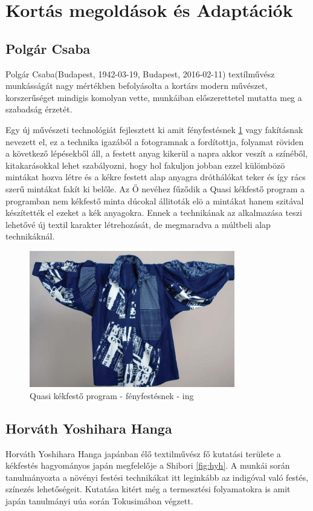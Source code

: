 \documentclass[fontsize=12pt, appendixprefix=true]{scrreprt}
\begin{document}
\section{Kortás megoldások és Adaptációk}

\subsection{Polgár Csaba}
Polgár Csaba(Budapest, 1942-03-19, Budapest, 2016-02-11) textílművész munkásságát nagy mértékben befolyásolta a kortárs modern művészet, korszerűséget mindigis komolyan vette, munkáiban előszerettetel mutatta meg a szabadság érzetét.

Egy új művészeti technológiát fejlesztett ki amit fényfestésnek \ref{fig:quasi} vagy fakításnak nevezett el, ez a technika igazából a fotogramnak a fordítottja, folyamat röviden  a következő lépésekből áll, a festett anyag kikerül a napra akkor veszít a színéből, kitakarásokkal lehet szabályozni, hogy hol fakuljon jobban ezzel külömbözö mintákat hozva létre és a kékre festett alap anyagra dróthálókat teker és így rács szerű mintákat fakít ki belőle.
Az Ő nevéhez fűződik a Quasi kékfestő program  a programban nem  kékfestő minta dúcokal állitoták elö a mintákat hanem szitával készítették el ezeket a kék anyagokra. Ennek a technikának az alkalmazása teszi lehetővé új textil karakter  létrehozását, de megmaradva a múltbeli alap technikáknál.

\begin{figure}[h!]
	\centering
	\includegraphics[width=0.8\textwidth]{img/quasi.jpg}
	\caption{Quasi kékfestő program - fényfestésnek - ing}
	\label{fig:quasi}
\end{figure}

\subsection{Horváth Yoshihara Hanga} 
Horváth Yoshihara Hanga japánban élő textilművész fő kutatási területe a kékfestés hagyományos japán megfelelője a Shibori \ref{fig:hyh}.
A munkái során tanulmányozta a növényi festési technikákat itt leginkább az indigóval való festés, színezés lehetőségeit. Kutatása kitért még a termesztési folyamatokra is amit japán tanulmányi uúa során Tokusimában végzett.
\end{document}
